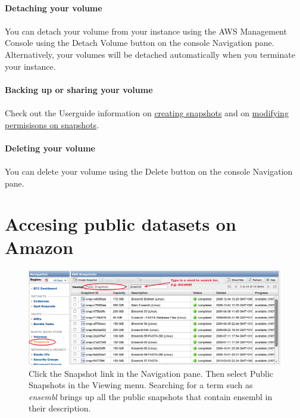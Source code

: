 \paragraph{Detaching your volume}
\paragraph{}You can detach your volume from your instance using the AWS Management Console using the Detach Volume button on the console Navigation pane. Alternatively, your volumes will be detached automatically when you terminate your instance.

\paragraph{Backing up or sharing your volume}
\paragraph{}Check out the Userguide information on \href{http://docs.amazonwebservices.com/AWSEC2/latest/UserGuide/creating-snapshot-ebs.html}{creating snapshots} and on \href{http://docs.amazonwebservices.com/AWSEC2/latest/UserGuide/modifying-snapshot-permissions-ebs.html}{modifying permisisons on snapshots}.


\paragraph{Deleting your volume}
\paragraph{}You can delete your volume using the Delete button on the console Navigation pane. 

\section{Accesing public datasets on Amazon}

\begin{figure}[!hd]
	\fbox
	{
		\begin{minipage}{13cm}
\includegraphics[width=\maxwidth]{"images/public-ensembl"}
\caption[List public data]{\label{fig:ensembl}Click the Snapshot link in the Navigation pane. Then select Public Snapshots in the Viewing menu. Searching for a term such as \emph{ensembl} brings up all the public snapshots that contain ensembl in their description. }
		\end{minipage}
	}
\end{figure}

